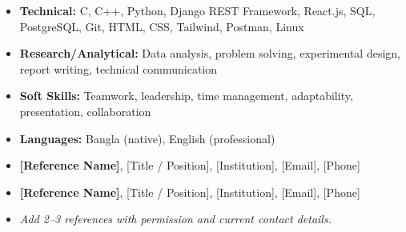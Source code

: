 \begin{itemize}
  \item \textbf{Technical:} C, C++, Python, Django REST Framework, React.js, SQL, PostgreSQL, Git, HTML, CSS, Tailwind, Postman, Linux
  \item \textbf{Research/Analytical:} Data analysis, problem solving, experimental design, report writing, technical communication
  \item \textbf{Soft Skills:} Teamwork, leadership, time management, adaptability, presentation, collaboration
  \item \textbf{Languages:} Bangla (native), English (professional)
\end{itemize}

\begin{itemize}
  \item \textbf{[Reference Name]}, [Title / Position], [Institution], [Email], [Phone]
  \item \textbf{[Reference Name]}, [Title / Position], [Institution], [Email], [Phone]
  \item \textit{Add 2--3 references with permission and current contact details.}
\end{itemize}
